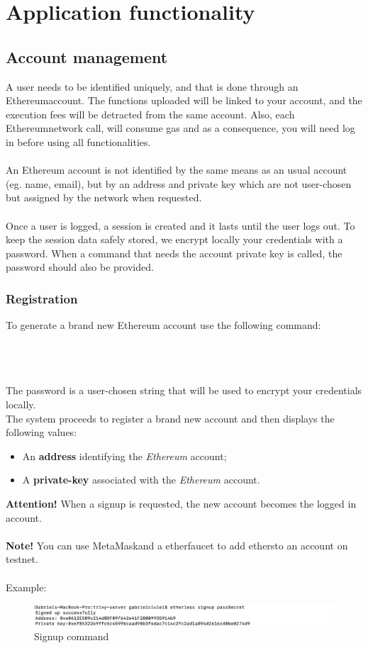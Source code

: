 \section{Application functionality}
\subsection{Account management}
A user needs to be identified uniquely, and that is done through an Ethereum\glo account. The functions uploaded will be linked to your account, and the execution fees will be detracted from the same account. Also, each Ethereum\glo network call, will consume gas and as a consequence, you will need log in before using all functionalities.\\\\An Ethereum account is not identified by the same means as an usual account (eg. name, email), but by an address and private key which are not user-chosen but assigned by the network when requested.
\\\\
Once a user is logged, a session is created and it lasts until the user logs out. To keep the session data safely stored, we encrypt locally your credentials with a password. When a command that needs the account private key is called, the password should also be provided.
\subsubsection{Registration}
To generate a brand new Ethereum account use the following command:\\\\
\centerline{}\\\\
The password is a user-chosen string that will be used to encrypt your credentials locally.\\
The system proceeds to register a brand new account and then displays the following values:
\begin{itemize}
	\item An \textbf{address} identifying the \textit{Ethereum\glos} account;
	\item A \textbf{private-key\glos} associated with the \textit{Ethereum\glos} account.
\end{itemize}
\textbf{Attention!} When a signup is requested, the new account becomes the logged in account.\\\\
\textbf{Note!} You can use MetaMask\glo and a ether\glo faucet to add ethers\glo to an account on testnet.\\\\
Example:
	\begin{figure}[h]
		\centering
		\includegraphics[width=\textwidth]{res/img/signup.png}
		\caption{Signup command}
	\end{figure}\\
